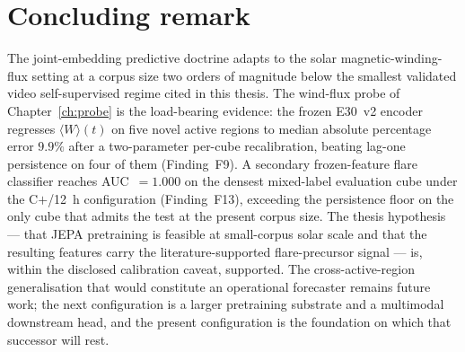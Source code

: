 \section{Concluding remark}
\label{sec:sum-final}

The joint-embedding predictive doctrine adapts to the solar
magnetic-winding-flux setting at a corpus size two orders of
magnitude below the smallest validated video self-supervised
regime cited in this thesis. The wind-flux probe of
Chapter~\ref{ch:probe} is the load-bearing evidence: the frozen
E30~v2 encoder regresses $\langle W \rangle(t)$ on five novel
active regions to median absolute percentage error $9.9\%$ after
a two-parameter per-cube recalibration, beating lag-one
persistence on four of them (Finding~F9). A secondary
frozen-feature flare classifier reaches AUC~$=1.000$ on the
densest mixed-label evaluation cube under the C$+$/12~h
configuration (Finding~F13), exceeding the persistence floor on
the only cube that admits the test at the present corpus size.
The thesis hypothesis --- that JEPA pretraining is feasible at
small-corpus solar scale and that the resulting features carry
the literature-supported flare-precursor signal --- is, within
the disclosed calibration caveat, supported. The
cross-active-region generalisation that would constitute an
operational forecaster remains future work; the next
configuration is a larger pretraining substrate and a multimodal
downstream head, and the present configuration is the foundation
on which that successor will rest.
